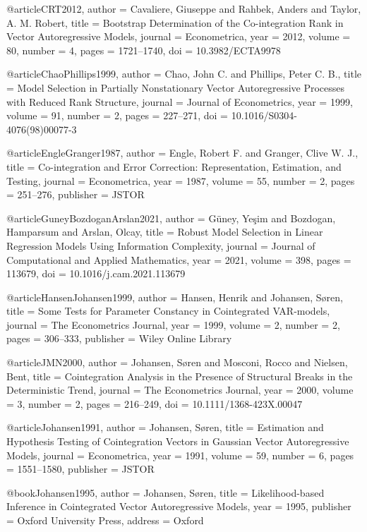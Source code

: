 @article{CRT2012,
	author  = {Cavaliere, Giuseppe and Rahbek, Anders and Taylor, A. M. Robert},
	title   = {Bootstrap Determination of the Co-integration Rank in Vector Autoregressive Models},
	journal = {Econometrica},
	year    = {2012},
	volume  = {80},
	number  = {4},
	pages   = {1721--1740},
	doi     = {10.3982/ECTA9978}
}

@article{ChaoPhillips1999,
	author  = {Chao, John C. and Phillips, Peter C. B.},
	title   = {Model Selection in Partially Nonstationary Vector Autoregressive Processes with Reduced Rank Structure},
	journal = {Journal of Econometrics},
	year    = {1999},
	volume  = {91},
	number  = {2},
	pages   = {227--271},
	doi     = {10.1016/S0304-4076(98)00077-3}
}

@article{EngleGranger1987,
	author  = {Engle, Robert F. and Granger, Clive W. J.},
	title   = {Co-integration and Error Correction: Representation, Estimation, and Testing},
	journal = {Econometrica},
	year    = {1987},
	volume  = {55},
	number  = {2},
	pages   = {251--276},
	publisher = {JSTOR}
}

@article{GuneyBozdoganArslan2021,
	author  = {G{\"u}ney, Ye{\c{s}}im and Bozdogan, Hamparsum and Arslan, Olcay},
	title   = {Robust Model Selection in Linear Regression Models Using Information Complexity},
	journal = {Journal of Computational and Applied Mathematics},
	year    = {2021},
	volume  = {398},
	pages   = {113679},
	doi     = {10.1016/j.cam.2021.113679}
}

@article{HansenJohansen1999,
	author  = {Hansen, Henrik and Johansen, S{\o}ren},
	title   = {Some Tests for Parameter Constancy in Cointegrated VAR-models},
	journal = {The Econometrics Journal},
	year    = {1999},
	volume  = {2},
	number  = {2},
	pages   = {306--333},
	publisher = {Wiley Online Library}
}

@article{JMN2000,
	author  = {Johansen, S{\o}ren and Mosconi, Rocco and Nielsen, Bent},
	title   = {Cointegration Analysis in the Presence of Structural Breaks in the Deterministic Trend},
	journal = {The Econometrics Journal},
	year    = {2000},
	volume  = {3},
	number  = {2},
	pages   = {216--249},
	doi     = {10.1111/1368-423X.00047}
}

@article{Johansen1991,
	author  = {Johansen, S{\o}ren},
	title   = {Estimation and Hypothesis Testing of Cointegration Vectors in Gaussian Vector Autoregressive Models},
	journal = {Econometrica},
	year    = {1991},
	volume  = {59},
	number  = {6},
	pages   = {1551--1580},
	publisher = {JSTOR}
}

@book{Johansen1995,
	author    = {Johansen, S{\o}ren},
	title     = {Likelihood-based Inference in Cointegrated Vector Autoregressive Models},
	year      = {1995},
	publisher = {Oxford University Press},
	address   = {Oxford}
}

